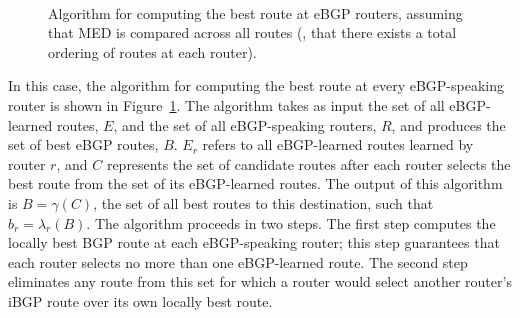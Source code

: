 \begin{figure}
 \\
\centering{}
\caption[Algorithm: Full Mesh, No MED]{Algorithm for computing the best
  route at eBGP 
  routers, assuming that MED is compared across all routes (\ie, that
  there exists a total ordering of routes at each router).}
\label{fig:b2_tot_order}
\end{figure}

In this case, the algorithm for computing the best route at every
eBGP-speaking router is shown in Figure~\ref{fig:b2_tot_order}.  The
algorithm takes as input the set of all eBGP-learned routes, $E$, and
the set of all eBGP-speaking routers, $R$, and produces the set of best
eBGP routes, $B$. $E_r$ refers to all eBGP-learned routes learned by
router $r$, and $C$ represents the set of candidate routes after each
router selects the best route from the set of its eBGP-learned routes.
The output of this algorithm is $B = \gamma(C)$, the set of all best
routes to this destination, such that $b_r = \lambda_r(B)$.  The
algorithm proceeds in two steps. The first step computes the locally
best BGP route at each eBGP-speaking router; this step guarantees that
each router selects no more than one eBGP-learned route.  The second
step eliminates any route from this set for which a router would select
another router's iBGP route over its own locally best route.

